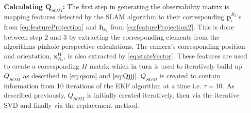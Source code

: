 \documentclass[10pt,twocolumn,letterpaper]{article}
\begin{document}
\textbf{Calculating $\boldsymbol{Q}_{SOM}$:} The first step in generating the observability matrix is mapping  features detected by the SLAM algorithm to their corresponding $\boldsymbol{p}_{i}^{R_k}$'s from \eqref{eq:featureProjection} and $\boldsymbol{h}_{x_i}$ from \eqref{eq:featureProjection2}. This is done between step 2 and 3 by extracting the corresponding elements from the algorithms pinhole perspective calculations. The camera's corresponding position and orientation, $\boldsymbol{x}_{R_k}^W$, is also extracted by  \eqref{eq:stateVector}. These features are used to create a corresponding $H$ matrix which in turn is used to iteratively build up $Q_{SOM}$ as described in \eqref{eq:qsom} and \eqref{eq:Qjjj}. $Q_{SOM}$ is created to contain information from 10 iterations of the EKF algorithm at a time i.e. $\tau = 10$. As described previously, $Q_{SOM}$ is initially created iteratively, then via the iterative SVD and finally via the replacement method.
  
\end{document}
